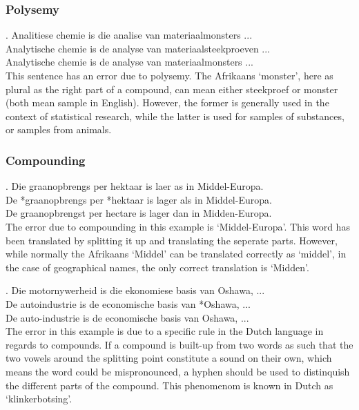 \documentclass[11pt]{article}
\begin{document}
\subsubsection{Polysemy}

\ex. \label{ex:expolysem} 
    Analitiese chemie is die analise van materiaalmonsters ... \\
    Analytische chemie is de analyse van materiaalsteekproeven ... \\
    Analytische chemie is de analyse van materiaalmonsters ... \\

This sentence has an error due to polysemy. The Afrikaans `monster', here as plural as the right part of a compound, 
can mean either steekproef or monster (both mean sample in English). However, the former is generally used in the context of statistical research, 
while the latter is used for samples of substances, or samples from animals. 

\subsubsection{Compounding}

\ex. \label{ex:excompsplit} 
    Die graanopbrengs per hektaar is laer as in Middel-Europa. \\
    De *graanopbrengs per *hektaar is lager als in Middel-Europa. \\
    De graanopbrengst per hectare is lager dan in Midden-Europa. \\

The error due to compounding in this example is `Middel-Europa'. This word has been translated by splitting it up and translating the seperate parts.
 However, while normally the Afrikaans `Middel' can be translated correctly as `middel', in the case of geographical names, the only correct translation is `Midden'.

\ex. \label{ex:excomphyphen} 
    Die motornywerheid is die ekonomiese basis van Oshawa, ...  \\
    De autoindustrie is de economische basis van *Oshawa, ... \\
    De auto-industrie is de economische basis van Oshawa, ... \\

The error in this example is due to a specific rule in the Dutch language in regards to compounds. If a compound is built-up from two words as such that 
the two vowels around the splitting point constitute a sound on their own, which means the word could be mispronounced,
 a hyphen should be used to distinquish the different parts of the compound. This phenomenom is known in Dutch as `klinkerbotsing'. 
\end{document}
